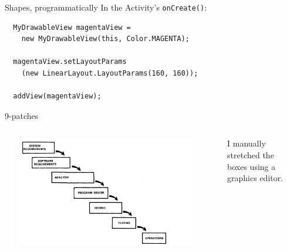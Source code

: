 \documentclass[aspectratio=169]{beamer}
\begin{document}
\begin{frame}[fragile]{Shapes, programmatically}
In the Activity's {\tt onCreate()}:
\begin{verbatim}
  MyDrawableView magentaView = 
    new MyDrawableView(this, Color.MAGENTA);
    
  magentaView.setLayoutParams
    (new LinearLayout.LayoutParams(160, 160));
    
  addView(magentaView);
\end{verbatim}
\end{frame}



\begin{frame}{9-patches}
\begin{columns}
\begin{column}{0.02\textwidth}\end{column}
\begin{column}{0.65\textwidth}
\includegraphics[width=0.95\textwidth]{img/concurrent-engineering.png}
\end{column}
\begin{column}{0.02\textwidth}\end{column}
\begin{column}{0.27\textwidth}
I manually stretched the boxes using a graphics editor.\\
\end{column}
\begin{column}{0.03\textwidth}\end{column}
\end{columns}
\end{frame}
\end{document}
